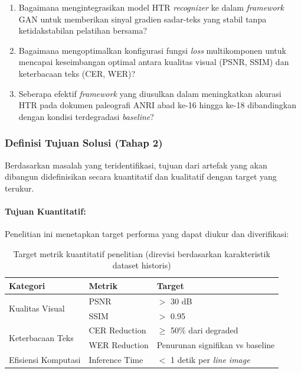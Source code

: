 \documentclass[12pt,a4paper]{book}
\begin{document}
\begin{enumerate}[label=\arabic*., leftmargin=*, nosep]
\begin{enumerate}[label=RQ\arabic*:, leftmargin=*, nosep]
\item Bagaimana mengintegrasikan model HTR \textit{recognizer} ke dalam \textit{framework} GAN untuk memberikan sinyal gradien sadar-teks yang stabil tanpa ketidakstabilan pelatihan bersama?

\item Bagaimana mengoptimalkan konfigurasi fungsi \textit{loss} multikomponen untuk mencapai keseimbangan optimal antara kualitas visual (PSNR, SSIM) dan keterbacaan teks (CER, WER)?

\item Seberapa efektif \textit{framework} yang diusulkan dalam meningkatkan akurasi HTR pada dokumen paleografi ANRI abad ke-16 hingga ke-18 dibandingkan dengan kondisi terdegradasi \textit{baseline}?
\end{enumerate}
\end{enumerate}

\subsubsection{Definisi Tujuan Solusi (Tahap 2)}
Berdasarkan masalah yang teridentifikasi, tujuan dari artefak yang akan dibangun didefinisikan secara kuantitatif dan kualitatif dengan target yang terukur.

\paragraph{Tujuan Kuantitatif:}

Penelitian ini menetapkan target performa yang dapat diukur dan diverifikasi:

\begin{table}[H]
\centering
\caption{Target metrik kuantitatif penelitian (direvisi berdasarkan karakteristik dataset historis)}
\label{tab:target-metrik}
\small
\begin{tabular}{|l|l|l|}
\hline
Kategori & Metrik & Target \\ \hline
\multirow{2}{*}{Kualitas Visual} & PSNR & $>$ 30 dB \footnotemark[1] \\ \cline{2-3}
 & SSIM & $>$ 0.95 \\ \hline
\multirow{2}{*}{Keterbacaan Teks} & CER Reduction & $\geq$ 50\% dari degraded \footnotemark[2] \\ \cline{2-3}
 & WER Reduction & Penurunan signifikan vs baseline \\ \hline
Efisiensi Komputasi & Inference Time & $<$ 1 detik per \textit{line image} \\ \hline
\end{tabular}
\end{table}
\end{document}
